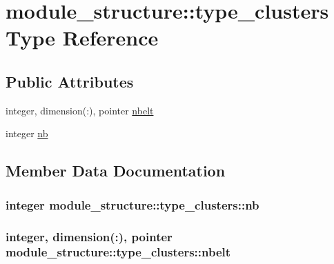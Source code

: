 \hypertarget{structmodule__structure_1_1type__clusters}{}\section{module\+\_\+structure\+:\+:type\+\_\+clusters Type Reference}
\label{structmodule__structure_1_1type__clusters}
\subsection*{Public Attributes}
\begin{DoxyCompactItemize}
\item 
integer, dimension(\+:), pointer \hyperlink{structmodule__structure_1_1type__clusters_a3b74e396e16d1393351f1e618377d5d3}{nbelt}
\item 
integer \hyperlink{structmodule__structure_1_1type__clusters_a64434771f896188453c607f24aa6246d}{nb}
\end{DoxyCompactItemize}


\subsection{Member Data Documentation}
\hypertarget{structmodule__structure_1_1type__clusters_a64434771f896188453c607f24aa6246d}{}
\subsubsection[{nb}]{\setlength{\rightskip}{0pt plus 5cm}integer module\+\_\+structure\+::type\+\_\+clusters\+::nb}\label{structmodule__structure_1_1type__clusters_a64434771f896188453c607f24aa6246d}
\hypertarget{structmodule__structure_1_1type__clusters_a3b74e396e16d1393351f1e618377d5d3}{}
\subsubsection[{nbelt}]{\setlength{\rightskip}{0pt plus 5cm}integer, dimension(\+:), pointer module\+\_\+structure\+::type\+\_\+clusters\+::nbelt}\label{structmodule__structure_1_1type__clusters_a3b74e396e16d1393351f1e618377d5d3}
